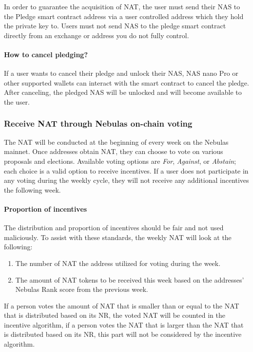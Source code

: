 In order to guarantee the acquisition of NAT, the user must send their NAS to the Pledge smart contract address via a user controlled address which they hold the private key to. Users must not send NAS to the pledge smart contract directly from an exchange or address you do not fully control.


\paragraph{How to cancel pledging?}

If a user wants to cancel their pledge and unlock their NAS, NAS nano Pro or other supported wallets can interact with the smart contract to cancel the pledge. After canceling, the pledged NAS will be unlocked and will become available to the user.

\subsubsection{Receive NAT through Nebulas on-chain voting}

The NAT will be conducted at the beginning of every week on the Nebulas
mainnet. Once addresses obtain NAT, they can choose to vote on various
proposals and elections. Available voting options are \textit{For}, \textit{Against}, or
\textit{Abstain}; each choice is a valid option to receive incentives. If a user does not participate in any voting during the weekly cycle, they will not receive any additional incentives the following week.


\paragraph{Proportion of incentives}

The distribution and proportion of incentives should be fair and not used maliciously. To assist with these standards, the weekly NAT will look at the following:

\begin{enumerate}
	\item The number of NAT the address utilized for voting during the week.
	\item The amount of NAT tokens to be received this week based on the addresses' Nebulas Rank score from the previous week.
\end{enumerate}

If a person votes the amount of NAT that is smaller than or equal to the NAT that is distributed based on its NR, the voted NAT will be counted in the incentive algorithm, if a person votes the NAT that is larger than the NAT that is distributed based on its NR, this part will not be considered by the incentive algorithm. 

